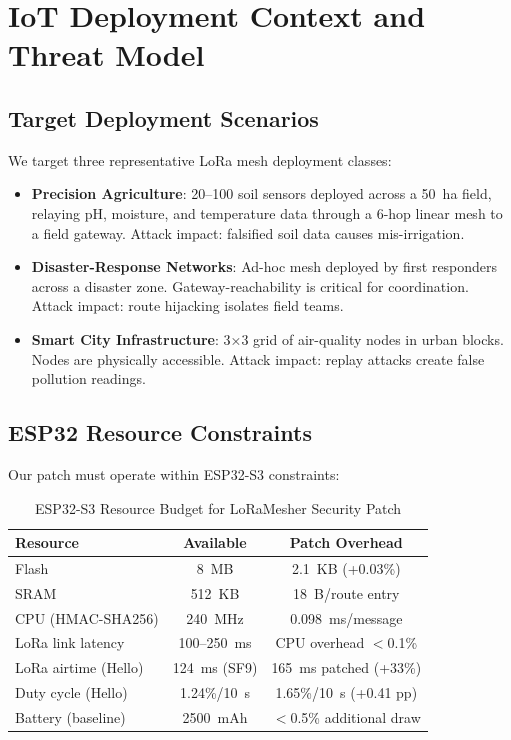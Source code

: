 \documentclass[10pt,journal,compsoc]{IEEEtran}
\begin{document}
\section{IoT Deployment Context and Threat Model}
\label{sec:threat}

\subsection{Target Deployment Scenarios}

We target three representative LoRa mesh deployment classes:

\begin{itemize}
  \item \textbf{Precision Agriculture}: 20–100 soil sensors deployed
    across a 50~ha field, relaying pH, moisture, and temperature
    data through a 6-hop linear mesh to a field gateway.
    Attack impact: falsified soil data causes mis-irrigation.

  \item \textbf{Disaster-Response Networks}: Ad-hoc mesh deployed
    by first responders across a disaster zone. Gateway-reachability
    is critical for coordination. Attack impact: route hijacking
    isolates field teams.

  \item \textbf{Smart City Infrastructure}: 3×3 grid of air-quality
    nodes in urban blocks. Nodes are physically accessible.
    Attack impact: replay attacks create false pollution readings.
\end{itemize}

\subsection{ESP32 Resource Constraints}

Our patch must operate within ESP32-S3 constraints:

\begin{table}[t]
  \centering
  \caption{ESP32-S3 Resource Budget for LoRaMesher Security Patch}
  \label{tab:esp32}
  \begin{tabular}{lcc}
    \toprule
    \textbf{Resource} & \textbf{Available} & \textbf{Patch Overhead} \\
    \midrule
    Flash              & 8~MB             & 2.1~KB (+0.03\%) \\
    SRAM               & 512~KB           & 18~B/route entry \\
    CPU (HMAC-SHA256)  & 240~MHz          & 0.098~ms/message \\
    LoRa link latency  & 100–250~ms       & CPU overhead $<$0.1\% \\
    LoRa airtime (Hello) & 124~ms (SF9)  & 165~ms patched (+33\%) \\
    Duty cycle (Hello) & 1.24\%/10~s    & 1.65\%/10~s (+0.41 pp) \\
    Battery (baseline) & 2500~mAh         & $<$0.5\% additional draw \\
    \bottomrule
  \end{tabular}
\end{table}
\end{document}
